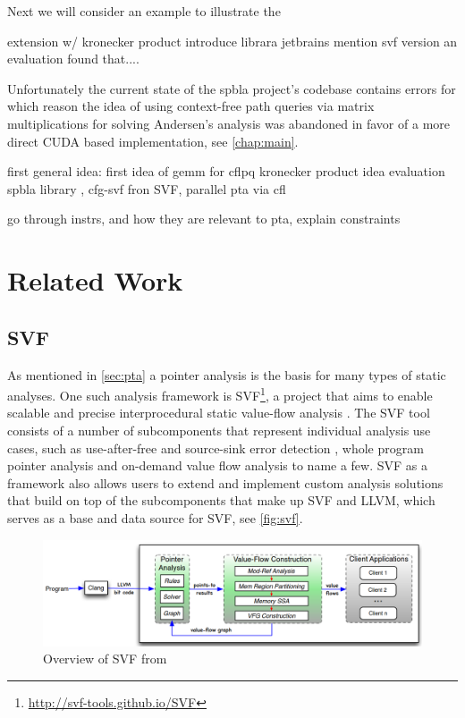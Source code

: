 Next we will consider an example to illustrate the

extension w/ kronecker product \cite{orachev2020context}
introduce librara jetbrains \cite{orachev2021spbla}
mention svf version \cite{lei2022taming}
an evaluation found that.... \cite{mishin2019evaluation}

Unfortunately the current state of the spbla project's codebase contains errors for which reason the idea of using context-free path queries via matrix multiplications for solving Andersen's analysis was abandoned in favor of a more direct CUDA based implementation, see \autoref{chap:main}.

first general idea: \cite{reps1998program} first idea of gemm for cflpq \cite{azimov2018context} kronecker product idea \cite{orachev2020context} evaluation \cite{mishin2019evaluation} spbla library \cite{orachev2021spbla}, cfg-svf \cite{lei2022taming} fron SVF, parallel pta via cfl \cite{su2014parallel}

go through instrs, and how they are relevant to pta, explain constraints \cite{lin2015alias}
\section{Related Work}
\subsection{SVF}
As mentioned in \autoref{sec:pta} a pointer analysis is the basis for many types of static analyses.
One such analysis framework is SVF\footnote{\url{http://svf-tools.github.io/SVF}}, a project that aims to enable scalable and precise interprocedural static value-flow analysis \cite{sui2016svf}. The SVF tool consists of a number of subcomponents that represent individual analysis use cases, such as use-after-free and source-sink error detection \cite{sui2014detecting}, whole program pointer analysis and on-demand value flow analysis \cite{sui2018value} to name a few.
SVF as a framework also allows users to extend and implement custom analysis solutions that build on top of the subcomponents that make up SVF and LLVM, which serves as a base and data source for SVF, see \autoref{fig:svf}.

\begin{figure}
    \centering
    \includegraphics[width=1.\textwidth]{img/svf.png}
    \caption{Overview of SVF from \cite{sui2016svf}}
    \label{fig:svf}
\end{figure}

